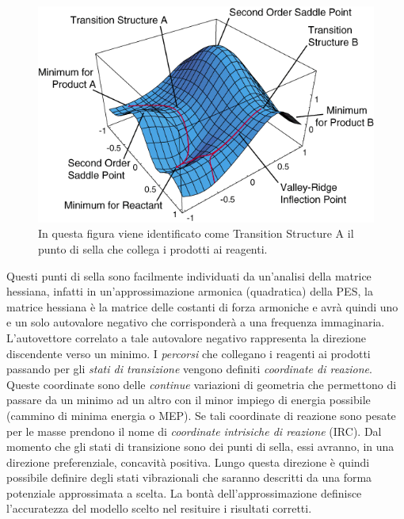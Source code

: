 \documentclass[oneside]{amsbook}
\numberwithin{section}{chapter}
\numberwithin{equation}{section}
\numberwithin{figure}{section}
\begin{document}
\begin{figure}[H]
\centering
\caption{ In questa figura viene identificato come Transition Structure A il punto di sella che collega i prodotti ai reagenti.}\label{pes}
\includegraphics[scale=0.3]{PES}
\end{figure}

Questi punti di sella sono facilmente individuati da un'analisi della matrice hessiana, infatti in un'approssimazione armonica (quadratica) della PES, la matrice hessiana è la matrice delle costanti di forza armoniche e avrà quindi uno e un solo autovalore negativo che corrisponderà a una frequenza immaginaria. L'autovettore correlato a tale autovalore negativo rappresenta la direzione discendente verso un minimo.
I \emph{percorsi} che collegano i reagenti ai prodotti passando per gli \emph{stati di transizione} vengono definiti \emph{coordinate di reazione}. Queste coordinate sono delle \emph{continue} variazioni di geometria che permettono di passare da un minimo ad un altro con il minor impiego di energia possibile (cammino di minima energia o MEP). Se tali coordinate di reazione sono pesate per le masse prendono il nome di \emph{coordinate intrisiche di reazione} (IRC).
Dal momento che gli stati di transizione sono dei punti di sella, essi avranno, in una direzione preferenziale, concavità positiva. Lungo questa direzione è quindi possibile definire degli stati vibrazionali che saranno descritti da una forma potenziale approssimata a scelta. La bontà dell'approssimazione definisce l'accuratezza del modello scelto nel resituire i risultati corretti.
\end{document}
